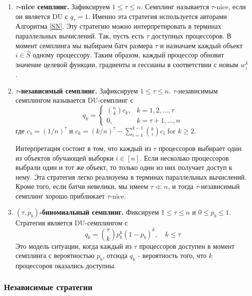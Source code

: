 \documentclass{article}
\theoremstyle{definition}
\theoremstyle{assumption}
\theoremstyle{lemma}
\theoremstyle{theorem}
\theoremstyle{proposition}
\begin{document}
	\begin{enumerate}
		\item \textbf{$\tau$-nice семплинг.}\label{nice} Зафиксируем $1 \leqslant \tau \leqslant n$. Семплинг называется $\tau$-nice, если он является DU с $q_\tau = 1$. Именно эта стратегия используется авторами Алгоритма \ref{SN}. Эту стратегию можно интерпретировать в терминах параллельных вычислений. Так, пусть есть $\tau$ доступных процессоров. В момент семплинга мы выбираем батч размера $\tau$ и назначаем каждый объект $i \in \hat S$ одному процессору. Таким образом, каждый процессор обновит значение целевой функции, градиенты и гессианы в соответствии с новым $w_i^k$.
		
		\item \textbf{$\tau$-независимый семплинг.}\label{tau-ind} Зафиксируем $1 \leqslant \tau \leqslant n$. $\tau$-независимым семплингом называется DU-семплинг с
		\begin{equation} 
			q_k = 
			\begin{cases}
				\binom{n}{k}c_k, & k = 1, 2, ..., \tau \\
				0, & k = \tau + 1, ..., n
			\end{cases}
		\end{equation}
		где $c_1 = (1/n)^\tau$ и $c_k = (k/n)^\tau - \sum \limits_{i=1}^{k-1} \binom{k}{i}c_i$ for $k \geqslant 2$.
		
		Интерпретация состоит в том, что каждый из $\tau$ процессоров выбирает один из объектов обучающей выборки $i \in [n]$. Если несколько процессоров выбрали один и тот же объект, то только один из них получает доступ к нему. Эта стратегия легко реализуема в терминах параллельных вычислений. Кроме того, если батчи невелики, мы имеем $\tau \ll n$, и тогда $\tau$-независимый семплинг хорошо приближает $\tau$-nice.
		
		\item \textbf{$(\tau, p_b)$-биномиальный семплинг.}\label{tau-bin} Фиксируем $1 \leqslant \tau \leqslant n$ и $0 \leqslant p_b \leqslant 1$. Стратегия является DU-семплингом с
		\begin{equation}
			q_k = \binom{\tau}{k}p_b^k(1 - p_b)^k, \quad k \leqslant \tau
		\end{equation}
		Это модель ситуации, когда каждый из $\tau$ процессоров доступен в момент семплинга с вероятностью $p_b$, отсюда $q_k$ - вероятность того, что $k$ процессоров оказались доступны.
	\end{enumerate}
	
	\subsubsection{Независимые стратегии}
	
\end{document}
